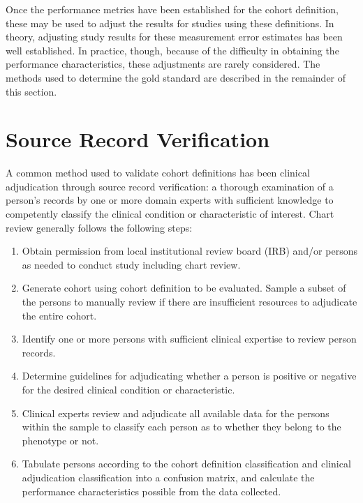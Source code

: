 \documentclass[11pt]{book}
\providecommand{\tightlist}{%
  \setlength{\itemsep}{0pt}\setlength{\parskip}{0pt}}
\theoremstyle{definition}
\theoremstyle{definition}
\theoremstyle{definition}
\theoremstyle{remark}
\begin{document}
Once the performance metrics have been established for the cohort
definition, these may be used to adjust the results for studies using
these definitions. In theory, adjusting study results for these
measurement error estimates has been well established. In practice,
though, because of the difficulty in obtaining the performance
characteristics, these adjustments are rarely considered. The methods
used to determine the gold standard are described in the remainder of
this section.

\section{Source Record Verification}\label{source-record-verification}


A common method used to validate cohort definitions has been clinical
adjudication through source record verification: a thorough examination
of a person's records by one or more domain experts with sufficient
knowledge to competently classify the clinical condition or
characteristic of interest. Chart review generally follows the following
steps:

\begin{enumerate}
\def\labelenumi{\arabic{enumi}.}
\tightlist
\item
  Obtain permission from local institutional review board (IRB) and/or
  persons as needed to conduct study including chart review.
\item
  Generate cohort using cohort definition to be evaluated. Sample a
  subset of the persons to manually review if there are insufficient
  resources to adjudicate the entire cohort.
\item
  Identify one or more persons with sufficient clinical expertise to
  review person records.
\item
  Determine guidelines for adjudicating whether a person is positive or
  negative for the desired clinical condition or characteristic.
\item
  Clinical experts review and adjudicate all available data for the
  persons within the sample to classify each person as to whether they
  belong to the phenotype or not.
\item
  Tabulate persons according to the cohort definition classification and
  clinical adjudication classification into a confusion matrix, and
  calculate the performance characteristics possible from the data
  collected.
\end{enumerate}
\end{document}
